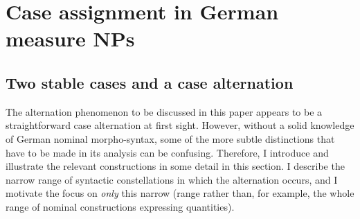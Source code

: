 \documentclass[USenglish]{article}
\begin{document}
%
%
%








\section{Case assignment in German measure NPs}
\label{sec:germanmeasurenps}


\subsection{Two stable cases and a case alternation}
\label{sec:descriptive}

The alternation phenomenon to be discussed in this paper appears to be a straightforward case alternation at first sight.
However, without a solid knowledge of German nominal morpho-syntax, some of the more subtle distinctions that have to be made in its analysis can be confusing.
Therefore, I introduce and illustrate the relevant constructions in some detail in this section.
I describe the narrow range of syntactic constellations in which the alternation occurs, and I motivate the focus on \textit{only} this narrow (range rather than, for example, the whole range of nominal constructions expressing quantities).
\end{document}

